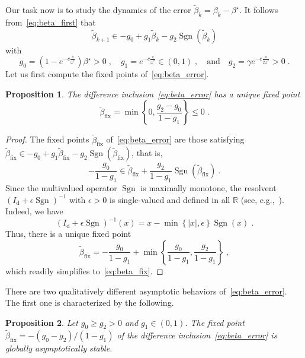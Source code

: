\documentclass{article}
\newcommand{\RR}{\mathbb{R}}
\newcommand{\rd}{\mathrm{d}}
\newcommand{\fix}{\mathrm{fix}}
\DeclareMathOperator{\sgn}{Sgn}
\newtheorem{proposition}{Proposition}
\theoremstyle{definition}
\theoremstyle{remark}
\begin{document}
Our task now is to study the dynamics of the error $\tilde{\beta}_k = \beta_k - \beta^\star$. It follows from~\eqref{eq:beta_first} that
\begin{equation} \label{eq:beta_error}
    \tilde{\beta}_{k+1} \in -g_0 + g_1 \tilde{\beta}_k - g_2 \sgn(\tilde{\beta}_k)
\end{equation}
with
\begin{equation} \label{eq:gs}
    g_0 = (1 - e^{-c\frac{\pi}{\omega^\star}}) \beta^\star > 0 \;, \quad g_1 = e^{-c\frac{\pi}{\omega^\star}} \in (0,1) \;, \quad
        \text{and} \quad  g_2 = \gamma e^{-c\frac{\pi}{2\omega^\star}} > 0\;.
\end{equation}
Let us first compute the fixed points of~\eqref{eq:beta_error}.

\begin{proposition}
    The difference inclusion~\eqref{eq:beta_error} has a unique fixed point
    \begin{equation} \label{eq:beta_fix}
        \tilde{\beta}_\fix = \min\left\{0,\frac{g_2-g_0}{1-g_1}\right\} \le 0 \;.
    \end{equation}
\end{proposition}

\begin{proof}
    The fixed points $\tilde{\beta}_\fix$ of~\eqref{eq:beta_error} are those satisfying $\tilde{\beta}_{\fix} \in -g_0 + g_1\tilde{\beta}_{\fix} - g_2 \sgn(\tilde{\beta}_\fix)$, that is,
    \begin{displaymath}
        -\frac{g_0}{1 - g_1} \in \tilde{\beta}_\fix + \frac{g_2}{1 - g_1} \sgn(\tilde{\beta}_\fix) \;.
    \end{displaymath}
    Since the multivalued operator $\sgn$ is maximally monotone, the resolvent $(I_\rd + \epsilon \sgn)^{-1}$ with $\epsilon > 0$ is single-valued and defined in all $\RR$ (see, e.g.,~\cite{bauschke}). Indeed, we have
    \begin{displaymath}
	   (I_\rd + \epsilon \sgn)^{-1}(x) = x - \min\left\{ |x|, \epsilon \right\} \sgn(x) \;.
    \end{displaymath}
    Thus, there is a unique fixed point
    \begin{displaymath}
        \tilde{\beta}_\fix = -\frac{g_0}{1-g_1} + \min\left\{ \frac{g_0}{1-g_1}, \frac{g_2}{1-g_1} \right\} \;,
    \end{displaymath}
    which readily simplifies to~\eqref{eq:beta_fix}.
\end{proof}

There are two qualitatively different asymptotic behaviors of~\eqref{eq:beta_error}. The first one is characterized by the following.
\begin{proposition} \label{prop:behav_1}
    Let $g_0 \geq g_2 > 0$ and $g_1 \in (0,1)$. The fixed point $\tilde{\beta}_\fix = -(g_0-g_2)/(1-g_1)$ of the difference inclusion~\eqref{eq:beta_error} is globally asymptotically stable.
\end{proposition}
\end{document}
